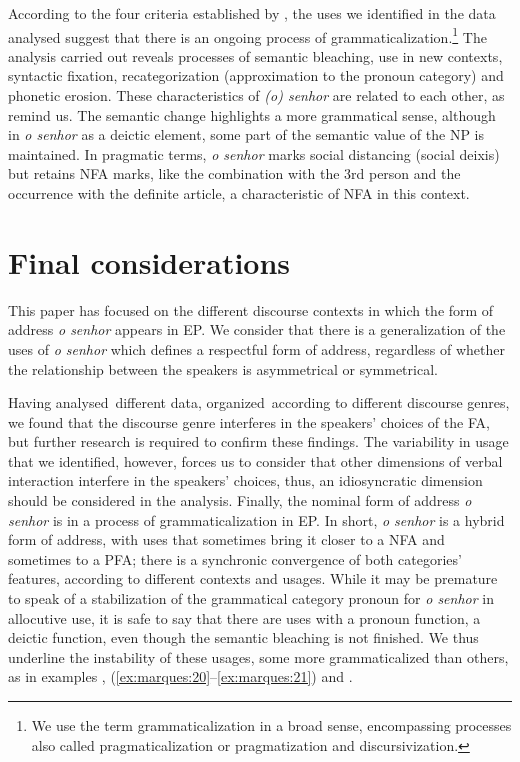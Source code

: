 \documentclass[output=paper]{langscibook}
\begin{document}
According to the four criteria established by \citet[17]{HeineKuteva2004}, the uses we identified in the data analysed suggest that there is an ongoing process of grammaticalization.\footnote{We use the term grammaticalization in a broad sense, encompassing processes also called pragmaticalization or pragmatization and discursivization.} The analysis carried out reveals processes of semantic bleaching, use in new contexts, syntactic fixation, recategorization (approximation to the pronoun category) and phonetic erosion. These characteristics of \textit{(o) senhor} are related to each other, as \citet{HeineKuteva2004} remind us. The semantic change highlights a more grammatical sense, although in \textit{o senhor} as a deictic element, some part of the semantic value of the NP is maintained. In pragmatic terms, \textit{o senhor} marks social distancing (social deixis) but retains NFA marks, like the combination with the 3rd person \citep{Carreira2009} and the occurrence with the definite article, a characteristic of NFA in this context.


\section{Final considerations}\label{sec:marques:5}

This paper has focused on the different discourse contexts in which the form of address \textit{o senhor} appears in EP. We consider that there is a generalization of the uses of \textit{o senhor} which defines a respectful form of address, regardless of whether the relationship between the speakers is asymmetrical or symmetrical.



Having analysed~different data, organized~according to different discourse genres, we found that the discourse genre interferes in the speakers’ choices of the FA, but further research is required to confirm these findings. The variability in usage that we identified, however, forces us to consider that other dimensions of verbal interaction interfere in the speakers’ choices, thus, an idiosyncratic dimension should be considered in the analysis. Finally, the nominal form of address \textit{o senhor} is in a process of grammaticalization in EP. In short, \textit{o senhor} is a hybrid form of address, with uses that sometimes bring it closer to a NFA and sometimes to a PFA; there is a synchronic convergence of both categories’ features, according to different contexts and usages. While it may be premature to speak of a stabilization of the grammatical category pronoun for \textit{o senhor} in allocutive use, it is safe to say that there are uses with a pronoun function, a deictic function, even though the semantic bleaching is not finished. We thus underline the instability of these usages, some more grammaticalized than others, as in examples , (\ref{ex:marques:20}--\ref{ex:marques:21}) and .
\end{document}
